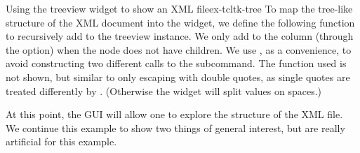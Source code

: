 \begin{example}{Using the treeview widget to show an XML file}{ex-tcltk-tree}
To map the tree-like structure of the XML document into the widget, we
define the following function to recursively add to the treeview
instance.  We only add to the  column (through the
 option) when the node does not have children. We use
, as a convenience, to avoid constructing two different
calls to the  subcommand. The  function
used is not shown, but similar to  only escaping
with double quotes, as single quotes are treated differently by
\TCL. (Otherwise the  widget will split values on
spaces.)
\begin{Schunk}
\end{Schunk}

At this point, the GUI will allow one to explore the structure of the
XML file. We continue this example to show two things of general
interest, but are really artificial for this example.



\end{example}
